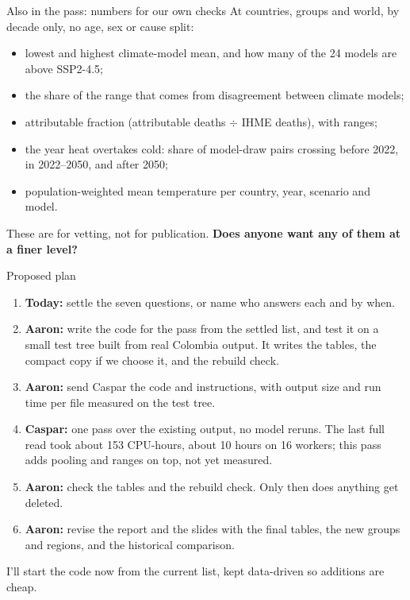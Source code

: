 \documentclass[aspectratio=169,11pt]{beamer}
\begin{document}
\begin{frame}{Also in the pass: numbers for our own checks}
  \small
  At countries, groups and world, by decade only, no age, sex or cause split:
  \begin{itemize}
    \item lowest and highest climate-model mean, and how many of the 24 models are above SSP2-4.5;
    \item the share of the range that comes from disagreement between climate models;
    \item attributable fraction (attributable deaths $\div$ IHME deaths), with ranges;
    \item the year heat overtakes cold: share of model-draw pairs crossing before 2022, in 2022--2050, and after 2050;
    \item population-weighted mean temperature per country, year, scenario and model.
  \end{itemize}
  \medskip
  These are for vetting, not for publication. \textbf{Does anyone want any of them at a finer level?}
\end{frame}

\begin{frame}{Proposed plan}
  \small
  \begin{enumerate}
    \item \textbf{Today:} settle the seven questions, or name who answers each and by when.
    \item \textbf{Aaron:} write the code for the pass from the settled list, and test it on a small test tree built from real Colombia output. It writes the tables, the compact copy if we choose it, and the rebuild check.
    \item \textbf{Aaron:} send Caspar the code and instructions, with output size and run time per file measured on the test tree.
    \item \textbf{Caspar:} one pass over the existing output, no model reruns. The last full read took about 153 CPU-hours, about 10 hours on 16 workers; this pass adds pooling and ranges on top, not yet measured.
    \item \textbf{Aaron:} check the tables and the rebuild check. Only then does anything get deleted.
    \item \textbf{Aaron:} revise the report and the slides with the final tables, the new groups and regions, and the historical comparison.
  \end{enumerate}
  \smallskip
  I'll start the code now from the current list, kept data-driven so additions are cheap.
\end{frame}
\end{document}
